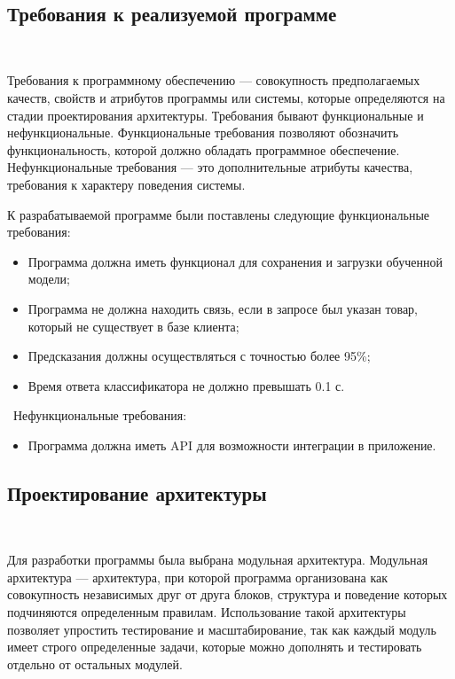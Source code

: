 \
\subsection{Требования к реализуемой программе}
\

Требования к программному обеспечению — совокупность предполагаемых качеств, свойств и атрибутов программы или системы, которые определяются на стадии проектирования архитектуры. Требования бывают функциональные и нефункциональные. Функциональные требования позволяют обозначить функциональность, которой должно обладать программное обеспечение. Нефункциональные требования — это дополнительные атрибуты качества, требования к характеру поведения системы.

К разрабатываемой программе были поставлены следующие функциональные требования:

\begin{itemize}
  \item Программа должна иметь функционал для сохранения и загрузки обученной модели;
  \item Программа не должна находить связь, если в запросе был указан товар, который не существует в базе клиента;
  \item Предсказания должны осуществляться с точностью более 95\%;
  \item Время ответа классификатора не должно превышать 0.1 с.
\end{itemize}

\
Нефункциональные требования:
\begin{itemize}
  \item Программа должна иметь API для возможности интеграции в приложение.
\end{itemize}

\newpage

\subsection{Проектирование архитектуры}
\

Для разработки программы была выбрана модульная архитектура. Модульная архитектура — архитектура, при которой программа организована как совокупность независимых друг от друга блоков, структура и поведение которых подчиняются определенным правилам. Использование такой архитектуры позволяет упростить тестирование и масштабирование, так как каждый модуль имеет строго определенные задачи, которые можно дополнять и тестировать отдельно от остальных модулей.

